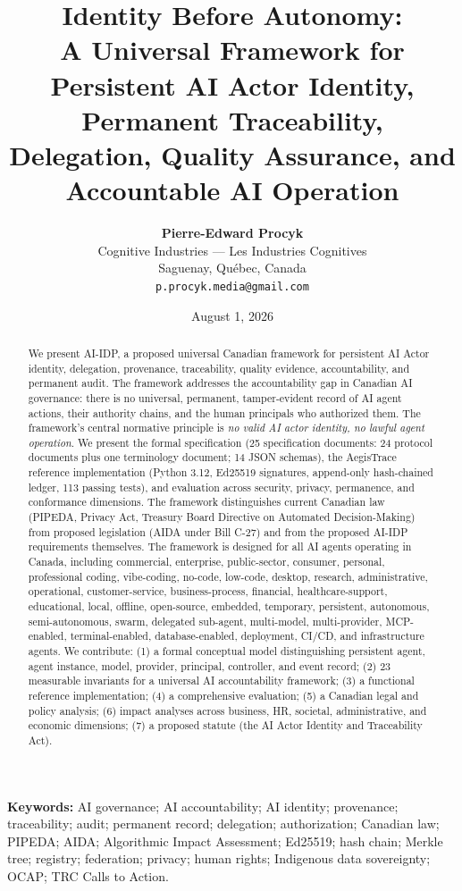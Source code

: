 \documentclass[11pt,a4paper]{article}
\title{\textbf{Identity Before Autonomy: \\ A Universal Framework for Persistent AI Actor Identity, Permanent Traceability, Delegation, Quality Assurance, and Accountable AI Operation}}
\author{
\textbf{Pierre-Edward Procyk}\\
Cognitive Industries --- Les Industries Cognitives\\
Saguenay, Québec, Canada\\
\texttt{p.procyk.media@gmail.com}
}
\date{August 1, 2026}
\begin{document}
\maketitle

\begin{abstract}
We present AI-IDP, a proposed universal Canadian framework for persistent AI Actor identity, delegation, provenance, traceability, quality evidence, accountability, and permanent audit. The framework addresses the accountability gap in Canadian AI governance: there is no universal, permanent, tamper-evident record of AI agent actions, their authority chains, and the human principals who authorized them. The framework's central normative principle is \textit{no valid AI actor identity, no lawful agent operation}. We present the formal specification (25 specification documents: 24 protocol documents plus one terminology document; 14 JSON schemas), the AegisTrace reference implementation (Python 3.12, Ed25519 signatures, append-only hash-chained ledger, 113 passing tests), and evaluation across security, privacy, permanence, and conformance dimensions. The framework distinguishes current Canadian law (PIPEDA, Privacy Act, Treasury Board Directive on Automated Decision-Making) from proposed legislation (AIDA under Bill C-27) and from the proposed AI-IDP requirements themselves. The framework is designed for all AI agents operating in Canada, including commercial, enterprise, public-sector, consumer, personal, professional coding, vibe-coding, no-code, low-code, desktop, research, administrative, operational, customer-service, business-process, financial, healthcare-support, educational, local, offline, open-source, embedded, temporary, persistent, autonomous, semi-autonomous, swarm, delegated sub-agent, multi-model, multi-provider, MCP-enabled, terminal-enabled, database-enabled, deployment, CI/CD, and infrastructure agents. We contribute: (1) a formal conceptual model distinguishing persistent agent, agent instance, model, provider, principal, controller, and event record; (2) 23 measurable invariants for a universal AI accountability framework; (3) a functional reference implementation; (4) a comprehensive evaluation; (5) a Canadian legal and policy analysis; (6) impact analyses across business, HR, societal, administrative, and economic dimensions; (7) a proposed statute (the AI Actor Identity and Traceability Act).
\end{abstract}

\noindent\textbf{Keywords:} AI governance; AI accountability; AI identity; provenance; traceability; audit; permanent record; delegation; authorization; Canadian law; PIPEDA; AIDA; Algorithmic Impact Assessment; Ed25519; hash chain; Merkle tree; registry; federation; privacy; human rights; Indigenous data sovereignty; OCAP; TRC Calls to Action.
\end{document}
